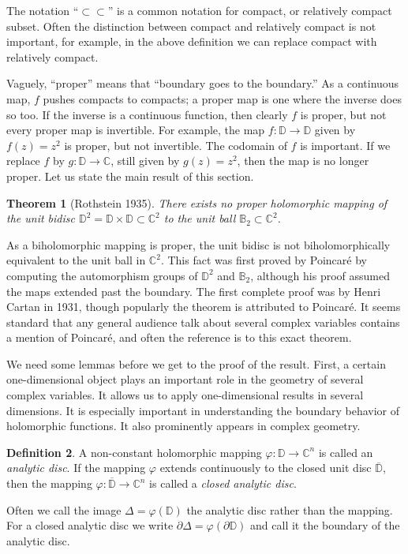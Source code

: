 \documentclass[12pt,openany]{book}
\newcommand{\C}{{\mathbb{C}}}
\newcommand{\D}{{\mathbb{D}}}
\newcommand{\bB}{{\mathbb{B}}}
\newcommand{\bD}{{\mathbb{D}}}
\newcommand{\myindex}[1]{#1\index{#1}}
\theoremstyle{plain}
\newtheorem{thm}{Theorem}[section]
\theoremstyle{remark}
\theoremstyle{definition}
\newtheorem{defn}[thm]{Definition}
\theoremstyle{exercise}
\theoremstyle{example}
\begin{document}
The notation ``$\subset \subset$'' is a common notation for compact, or relatively
compact subset.  Often the distinction between compact and relatively
compact is not important, for example, in the above definition we can replace
compact with relatively compact.

Vaguely, ``proper'' means that ``boundary goes to the boundary.''
As a continuous map, $f$ pushes compacts to compacts; a proper map is
one where the inverse does so too.  If the inverse is a continuous
function, then clearly $f$ is proper,
but not every proper map is invertible.  For
example, the map $f \colon \D \to \D$ given by $f(z) = z^2$ is proper, but
not invertible.  The codomain of $f$ is important.  If we 
replace $f$ by $g \colon \D \to \C$, still given by $g(z)=z^2$,
then the map is
no longer proper.  Let us state the main result of this section.

\begin{thm}[Rothstein 1935] \label{thm:Rothstein}
There exists no proper holomorphic mapping of the unit bidisc $\D^2 = \bD \times \bD
\subset \C^2$ to the unit ball $\bB_2 \subset \C^2$.
\end{thm}

As a biholomorphic mapping is proper,
the unit bidisc is not biholomorphically
equivalent to the unit ball in $\C^2$.  This fact was first proved by
Poincar\'e by computing the automorphism groups of $\D^2$ and $\bB_2$,
although his proof
assumed the maps extended past the boundary.  The first
complete proof was by Henri Cartan in 1931, though popularly the theorem is
attributed to Poincar\'e.  It seems standard that any general audience talk
about several complex variables contains a mention of Poincar\'e,
and often the reference is to this exact theorem.

We need some lemmas before we get to the proof of the result.  First,
a certain one-dimensional object plays an important role in the geometry
of several complex variables.  It allows us to apply one-dimensional
results in several dimensions.  It is especially important in
understanding the boundary behavior of holomorphic functions.  It also
prominently appears in complex geometry.

\begin{defn}
A non-constant holomorphic mapping
$\varphi \colon \D \to \C^n$ is called an \emph{\myindex{analytic disc}}.
If the mapping $\varphi$ extends continuously to the closed unit disc
$\overline{\D}$, then the mapping
$\varphi \colon \overline{\D} \to \C^n$ is called
a \emph{\myindex{closed analytic disc}}.

Often we call the image $\Delta = \varphi(\D)$ the analytic disc
rather than the mapping.  For a closed analytic disc we write
$\partial \Delta = \varphi( \partial \D)$ and call it the boundary
of the analytic disc.
\end{defn}
\end{document}
